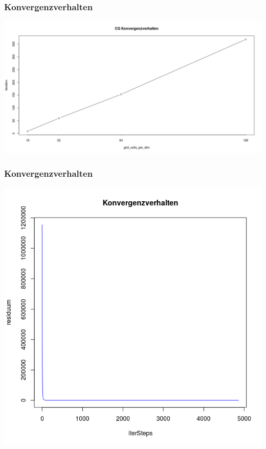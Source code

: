 \documentclass[]{beamer}
\begin{document}
\begin{frame}
\frametitle{Konvergenzverhalten}
\begin{center}
\includegraphics[scale=0.22]{CG_Konvergenzverhalten.png}
\end{center}
\end{frame}


\begin{frame}
\frametitle{Konvergenzverhalten}
\begin{center}
\includegraphics[scale=0.3]{Konvergenzverhalten_ganz.png}
\end{center}
\end{frame}
\end{document}

